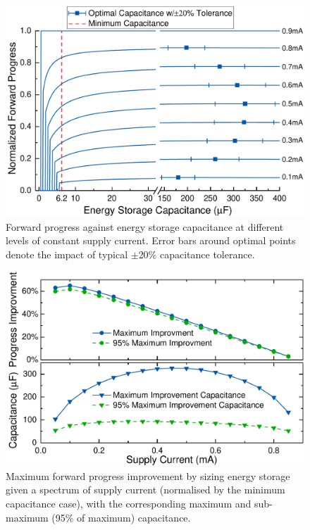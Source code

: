 \begin{figure}[!t]
  \centering
  \includegraphics[width=0.8\columnwidth]{ch3_sizingeffect/figures/StorCCur6Fig} 
  \caption{Forward progress against energy storage capacitance at different levels of constant supply current. Error bars around optimal points denote the impact of typical $\pm$20\% capacitance tolerance. }
  \label{fig:fpwconstcurr}
\end{figure}

\begin{figure}[!t]
  \centering
  \includegraphics[width=0.8\columnwidth]{ch3_sizingeffect/figures/StorCCurMax4Fig}
  \caption{Maximum forward progress improvement by sizing energy storage given a spectrum of supply current (normalised by the minimum capacitance case), with the corresponding maximum and sub-maximum (95\% of maximum) capacitance. }
  \label{fig:maxfwp}
\end{figure}

